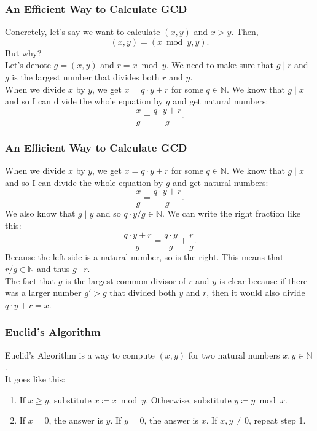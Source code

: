 \documentclass[aspectratio=169,11pt,usenames,dvipsnames]{beamer}
\newcommand{\N}{\mathbb{N}}
\begin{document}
\begin{frame}
 \frametitle{An Eff\hspace*{0pt}icient Way to Calculate GCD}
 Concretely, let's say we want to calculate $(x,y)$ and $x > y$. Then,
 \[
  (x,y) = (x \bmod y, y).
 \]
 But why?\\
 \pause
 Let's denote $g = (x,y)$ and $r = x \bmod y$. We need to make sure that $g \mid
 r$ and $g$ is the largest number that divides both $r$ and $y$.\\
 \pause
 When we divide $x$ by $y$, we get $x = q \cdot y + r$ for some $q \in \N$. We
 know that $g \mid x$ and so I can divide the whole equation by $g$ and get
 natural numbers:
 \[
  \frac{x}{g} = \frac{q \cdot y + r}{g}.
 \]
\end{frame}

\begin{frame}
 \frametitle{An Eff\hspace*{0pt}icient Way to Calculate GCD}
 When we divide $x$ by $y$, we get $x = q \cdot y + r$ for some $q \in \N$. We
 know that $g \mid x$ and so I can divide the whole equation by $g$ and get
 natural numbers:
 \[
  \frac{x}{g} = \frac{q \cdot y + r}{g}.
 \]
 We also know that $g \mid y$ and so $q \cdot y / g \in \N$. We can write the
 right fraction like this:
 \[
  \frac{q \cdot y + r}{g} = \frac{q \cdot y}{g} + \frac{r}{g}.
 \]
 Because the left side is a natural number, so is the right. This means that $r
 / g \in \N$ and thus $g \mid r$.\\
 \pause
 The fact that $g$ is the \alert{largest} common divisor of $r$ and $y$ is clear
 because if there was a larger number $g'>g$ that divided both $y$ and $r$, then
 it would also divide $q \cdot y + r = x$.
\end{frame}

\begin{frame}
 \frametitle{Euclid's Algorithm}
 \alert{Euclid's Algorithm} is a way to compute $(x,y)$ for two natural numbers
 $x,y \in \N$.\\
 \pause
 It goes like this:
 \begin{enumerate}
  \item If $x \geq y$, substitute $x \coloneqq x \bmod y$. Otherwise, substitute
   $y \coloneqq y \bmod x$.
  \pause 
  \item If $x = 0$, the answer is $y$. If $y = 0$, the answer is $x$. If $x,y
   \neq 0$, repeat step 1.
 \end{enumerate}
\end{frame}
\end{document}
